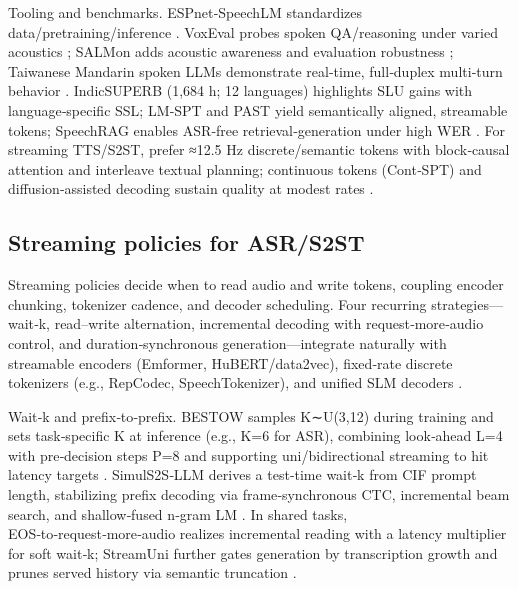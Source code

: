 Tooling and benchmarks. ESPnet‑SpeechLM standardizes data/pretraining/inference \cite{tian2025espnetspeechlmopenspeechlanguagemodeltoo}. VoxEval probes spoken QA/reasoning under varied acoustics \cite{cui2025voxevalbenchmarkingknowledgeunderstandin}; SALMon adds acoustic awareness and evaluation robustness \cite{maimon2025salmonsuiteacousticlanguagemodelevaluati}; Taiwanese Mandarin spoken LLMs demonstrate real‑time, full‑duplex multi‑turn behavior \cite{yang2024buildingtaiwanesemandarinspokenlanguagem}. IndicSUPERB (1,684 h; 12 languages) highlights SLU gains with language‑specific SSL; LM‑SPT and PAST yield semantically aligned, streamable tokens; SpeechRAG enables ASR‑free retrieval‑generation under high WER \cite{entry2025indicsuperbspeechprocessinguniversalperf,jo2025lmsptalignedsemanticdistillationspeechto,har-tuv2025pastphoneticacousticspeechtokenizer,min2025speechretrievalaugmentedgenerationwithou}. For streaming TTS/S2ST, prefer ≈12.5 Hz discrete/semantic tokens with block‑causal attention and interleave textual planning; continuous tokens (Cont‑SPT) and diffusion‑assisted decoding sustain quality at modest rates \cite{li2025continuousspeechtokenizertext,bai2025dmelspeechtokenizationmadesimple,zhao2024textlessstreamingspeechtranslationsemant,yang2025diffsoundstreamefficientspeechtokenizati}.



\subsection{Streaming policies for ASR/S2ST} \label{subsec:Streaming policies for ASR/S2ST}

Streaming policies decide when to read audio and write tokens, coupling encoder chunking, tokenizer cadence, and decoder scheduling. Four recurring strategies—wait‑k, read–write alternation, incremental decoding with request‑more‑audio control, and duration‑synchronous generation—integrate naturally with streamable encoders (Emformer, HuBERT/data2vec), fixed‑rate discrete tokenizers (e.g., RepCodec, SpeechTokenizer), and unified SLM decoders \cite{huang2024repcodecspeechrepresentationcodectokeniz,zhang2024speechtokenizerunifiedspeechtokenizerlar}.

Wait‑k and prefix‑to‑prefix. BESTOW samples K∼U(3,12) during training and sets task‑specific K at inference (e.g., K=6 for ASR), combining look‑ahead L=4 with pre‑decision steps P=8 and supporting uni/bidirectional streaming to hit latency targets \cite{chen2024bestowefficientstreamablespeechlanguagem}. SimulS2S‑LLM derives a test‑time wait‑k from CIF prompt length, stabilizing prefix decoding via frame‑synchronous CTC, incremental beam search, and shallow‑fused n‑gram LM \cite{deng2025simuls2sllmunlockingsimultaneousinferenc}. In shared tasks, EOS‑to‑request‑more‑audio realizes incremental reading with a latency multiplier for soft wait‑k; StreamUni further gates generation by transcription growth and prunes served history via semantic truncation \cite{ouyang2025cmusiwslt2025simultaneousspeechtranslati,guo2025streamuniachievingstreamingspeechtransla}.


